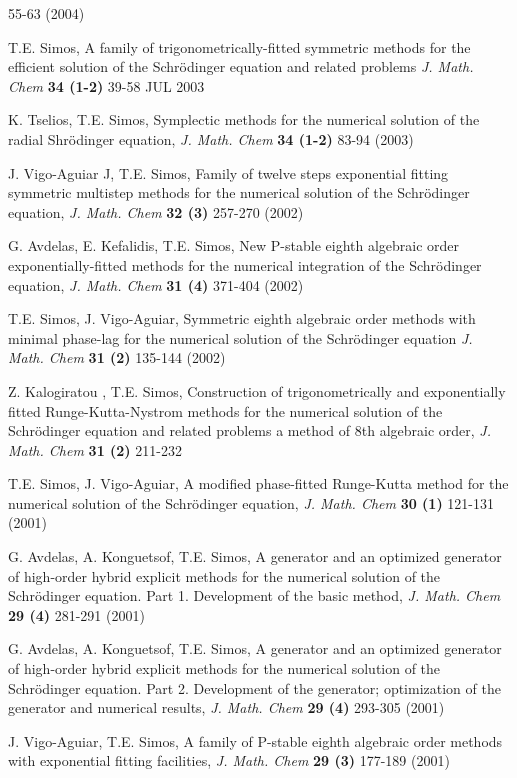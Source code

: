 \documentclass[numreferences]{kluwer}
\begin{document}
\begin{article}
\begin{thebibliography}{120}
55-63 (2004)

T.E. Simos, A family of trigonometrically-fitted symmetric methods
for the efficient solution of the Schr\"odinger equation and
related problems {\it J. Math. Chem} {\bf 34 (1-2)} 39-58 JUL 2003

K. Tselios, T.E. Simos, Symplectic methods for the numerical
solution of the radial Shr\"odinger equation, {\it J. Math. Chem}
{\bf 34 (1-2)} 83-94 (2003)

J. Vigo-Aguiar J, T.E. Simos, Family of twelve steps exponential
fitting symmetric multistep methods for the numerical solution of
the Schr\"odinger equation, {\it J. Math. Chem} {\bf 32 (3)}
257-270 (2002)

G. Avdelas, E. Kefalidis, T.E. Simos, New P-stable eighth
algebraic order exponentially-fitted methods for the numerical
integration of the Schr\"odinger equation, {\it J. Math. Chem}
{\bf 31 (4)} 371-404 (2002)

T.E. Simos, J. Vigo-Aguiar, Symmetric eighth algebraic order
methods with minimal phase-lag for the numerical solution of the
Schr\"odinger equation {\it J. Math. Chem} {\bf 31 (2)} 135-144
(2002)

Z. Kalogiratou , T.E. Simos, Construction of trigonometrically and
exponentially fitted Runge-Kutta-Nystrom methods for the numerical
solution of the Schr\"odinger equation and related problems a
method of 8th algebraic order, {\it J. Math. Chem} {\bf 31 (2)}
211-232

T.E. Simos, J. Vigo-Aguiar, A modified phase-fitted Runge-Kutta
method for the numerical solution of the Schr\"odinger equation,
{\it J. Math. Chem} {\bf 30 (1)} 121-131 (2001)

G. Avdelas, A. Konguetsof, T.E. Simos, A generator and an
optimized generator of high-order hybrid explicit methods for the
numerical solution of the Schr\"odinger equation. Part 1.
Development of the basic method, {\it J. Math. Chem} {\bf 29 (4)}
281-291 (2001)

G. Avdelas, A. Konguetsof, T.E. Simos, A generator and an
optimized generator of high-order hybrid explicit methods for the
numerical solution of the Schr\"odinger equation. Part 2.
Development of the generator; optimization of the generator and
numerical results, {\it J. Math. Chem} {\bf 29 (4)} 293-305 (2001)

J. Vigo-Aguiar, T.E. Simos, A family of P-stable eighth algebraic
order methods with exponential fitting facilities, {\it J. Math.
Chem} {\bf 29 (3)} 177-189 (2001)


\end{thebibliography}
\end{article}
\end{document}

